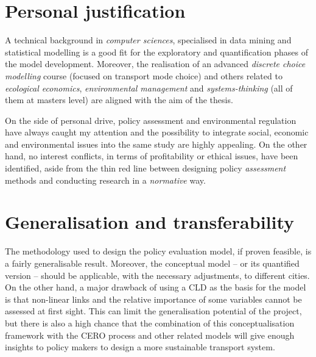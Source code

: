 \section{Personal justification}
\label{s:personal-justification}
A technical background in \textit{computer sciences}, specialised in data mining and statistical modelling is a good fit for the exploratory and quantification phases of the model development. Moreover, the realisation of an advanced \textit{discrete choice modelling} course (focused on transport mode choice) and others related to \textit{ecological economics}, \textit{environmental management} and \textit{systems-thinking} (all of them at masters level) are aligned with the aim of the thesis.

On the side of personal drive, policy assessment and environmental regulation have always caught my attention and the possibility to integrate social, economic and environmental issues into the same study are highly appealing. On the other hand, no interest conflicts, in terms of profitability or ethical issues, have been identified, aside from the thin red line between designing policy \textit{assessment} methods and conducting research in a \textit{normative} way.

\section{Generalisation and transferability}
\label{s:generalisation}
The methodology used to design the policy evaluation model, if proven feasible, is a fairly generalisable result. Moreover, the conceptual model -- or its quantified version -- should be applicable, with the necessary adjustments, to different cities. On the other hand, a major drawback of using a CLD as the basis for the model is that non-linear links and the relative importance of some variables cannot be assessed at first sight. This can limit the generalisation potential of the project, but there is also a high chance that the combination of this conceptualisation framework with the CERO process and other related models will give enough insights to policy makers to design a more sustainable transport system.